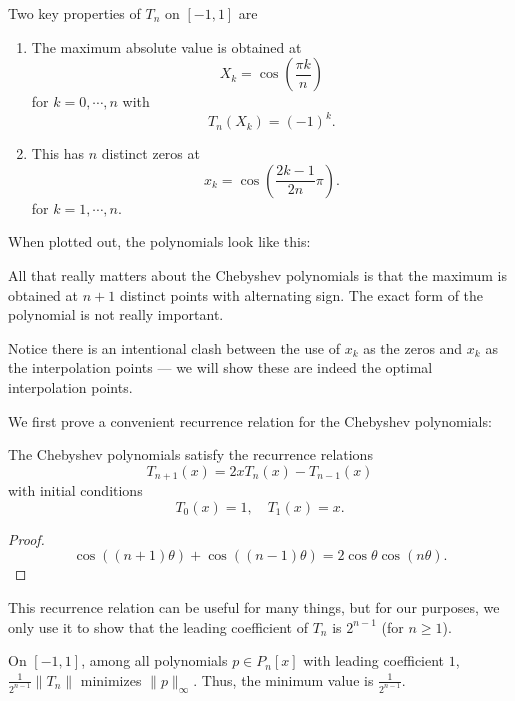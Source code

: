 \documentclass[a4paper]{article}
\begin{document}
Two key properties of $T_n$ on $[-1, 1]$ are
\begin{enumerate}
  \item The maximum absolute value is obtained at
    \[
      X_k = \cos\left(\frac{\pi k}{n}\right)
    \]
    for $k = 0, \cdots, n$ with
    \[
      T_n(X_k) = (-1)^k.
    \]
  \item This has $n$ distinct zeros at
    \[
      x_k = \cos\left(\frac{2k - 1}{2n}\pi\right).
    \]
    for $k = 1, \cdots, n$.
\end{enumerate}
When plotted out, the polynomials look like this:
\begin{center}
\end{center}
All that really matters about the Chebyshev polynomials is that the maximum is obtained at $n + 1$ distinct points with alternating sign. The exact form of the polynomial is not really important.

Notice there is an intentional clash between the use of $x_k$ as the zeros and $x_k$ as the interpolation points --- we will show these are indeed the optimal interpolation points.

We first prove a convenient recurrence relation for the Chebyshev polynomials:
\begin{lemma}
  The Chebyshev polynomials satisfy the recurrence relations
  \[
    T_{n + 1}(x) = 2x T_n(x) - T_{n - 1}(x)
  \]
  with initial conditions
  \[
    T_0(x) = 1,\quad T_1(x) = x.
  \]
\end{lemma}

\begin{proof}
  \[
    \cos((n + 1) \theta) + \cos((n - 1)\theta) = 2\cos \theta \cos(n\theta).
  \]
\end{proof}
This recurrence relation can be useful for many things, but for our purposes, we only use it to show that the leading coefficient of $T_n$ is $2^{n - 1}$ (for $n \geq 1$).

\begin{thm}
  On $[-1, 1]$, among all polynomials $p \in P_n[x]$ with leading coefficient $1$, $\frac{1}{2^{n - 1}} \|T_n\|$ minimizes $\|p\|_{\infty}$. Thus, the minimum value is $\frac{1}{2^{n - 1}}$.
\end{thm}
\end{document}
